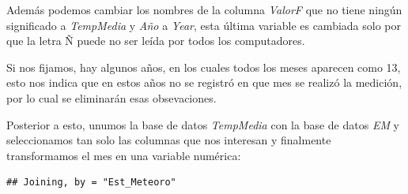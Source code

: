\documentclass[]{book}
\newenvironment{Shaded}{\begin{snugshade}}{\end{snugshade}}
\newcommand{\DataTypeTok}[1]{\textcolor[rgb]{0.13,0.29,0.53}{#1}}
\newcommand{\DecValTok}[1]{\textcolor[rgb]{0.00,0.00,0.81}{#1}}
\newcommand{\KeywordTok}[1]{\textcolor[rgb]{0.13,0.29,0.53}{\textbf{#1}}}
\newcommand{\NormalTok}[1]{#1}
\newcommand{\OperatorTok}[1]{\textcolor[rgb]{0.81,0.36,0.00}{\textbf{#1}}}
\newcommand{\StringTok}[1]{\textcolor[rgb]{0.31,0.60,0.02}{#1}}
\begin{document}
\begin{Shaded}
\end{Shaded}

Además podemos cambiar los nombres de la columna \emph{ValorF} que no
tiene ningún significado a \emph{TempMedia} y \emph{Año} a \emph{Year},
esta última variable es cambiada solo por que la letra Ñ puede no ser
leída por todos los computadores.

\begin{Shaded}
\end{Shaded}

Si nos fijamos, hay algunos años, en los cuales todos los meses aparecen
como 13, esto nos indica que en estos años no se registró en que mes se
realizó la medición, por lo cual se eliminarán esas obsevaciones.

\begin{Shaded}
\end{Shaded}

Posterior a esto, unumos la base de datos \emph{TempMedia} con la base
de datos \emph{EM} y seleccionamos tan solo las columnas que nos
interesan y finalmente transformamos el mes en una variable numérica:

\begin{verbatim}
## Joining, by = "Est_Meteoro"
\end{verbatim}

\begin{Shaded}
\end{Shaded}
\end{document}
